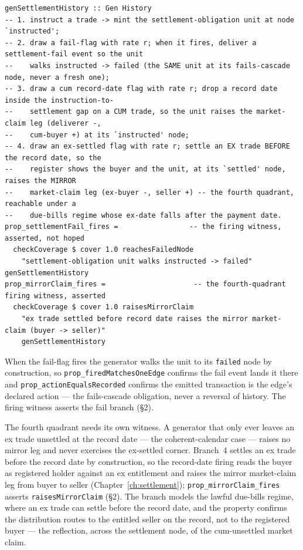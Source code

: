 \documentclass[11pt,a4paper]{article}
\begin{document}
\begin{lstlisting}
genSettlementHistory :: Gen History
-- 1. instruct a trade -> mint the settlement-obligation unit at node `instructed';
-- 2. draw a fail-flag with rate r; when it fires, deliver a settlement-fail event so the unit
--    walks instructed -> failed (the SAME unit at its fails-cascade node, never a fresh one);
-- 3. draw a cum record-date flag with rate r; drop a record date inside the instruction-to-
--    settlement gap on a CUM trade, so the unit raises the market-claim leg (deliverer -,
--    cum-buyer +) at its `instructed' node;
-- 4. draw an ex-settled flag with rate r; settle an EX trade BEFORE the record date, so the
--    register shows the buyer and the unit, at its `settled' node, raises the MIRROR
--    market-claim leg (ex-buyer -, seller +) -- the fourth quadrant, reachable under a
--    due-bills regime whose ex-date falls after the payment date.
prop_settlementFail_fires =                 -- the firing witness, asserted, not hoped
  checkCoverage $ cover 1.0 reachesFailedNode
    "settlement-obligation unit walks instructed -> failed" genSettlementHistory
prop_mirrorClaim_fires =                     -- the fourth-quadrant firing witness, asserted
  checkCoverage $ cover 1.0 raisesMirrorClaim
    "ex trade settled before record date raises the mirror market-claim (buyer -> seller)"
    genSettlementHistory
\end{lstlisting}

When the fail-flag fires the generator walks the unit to its \texttt{failed} node by
construction, so \texttt{prop\_firedMatchesOneEdge} confirms the fail event lands it there
and \texttt{prop\_actionEqualsRecorded} confirms the emitted transaction is the edge's
declared action --- the fails-cascade obligation, never a reversal of history. The firing
witness asserts the fail branch (\S 2).

The fourth quadrant needs its own witness. A generator that only ever leaves an ex trade
unsettled at the record date --- the coherent-calendar case --- raises no mirror leg and
never exercises the ex-settled corner. Branch~4 settles an ex trade before the record date
by construction, so the record-date firing reads the buyer as registered holder against an
ex entitlement and raises the mirror market-claim leg from buyer to seller
(Chapter~\ref{ch:settlement}); \texttt{prop\_mirrorClaim\_fires} asserts
\texttt{raisesMirrorClaim} (\S 2). The branch
models the lawful due-bills regime, where an ex trade can settle before the record date, and
the property confirms the distribution routes to the entitled seller on the record, not to
the registered buyer --- the reflection, across the settlement node, of the cum-unsettled
market claim.
\end{document}
